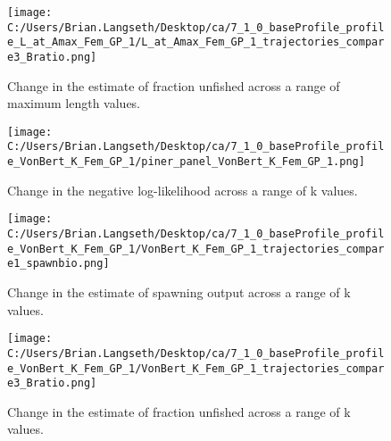 \documentclass[11pt,
  english,
  a4paper,
]{article}
\begin{document}

\begin{figure}
\centering
\texttt{[image: C:/Users/Brian.Langseth/Desktop/ca/7\_1\_0\_baseProfile\_profile\_L\_at\_Amax\_Fem\_GP\_1/L\_at\_Amax\_Fem\_GP\_1\_trajectories\_compare3\_Bratio.png]}
\caption{Change in the estimate of fraction unfished across a range of maximum length values.\label{fig:linf-depl}}
\end{figure}

\tagmcend\tagstructend


\begin{figure}
\centering
\texttt{[image: C:/Users/Brian.Langseth/Desktop/ca/7\_1\_0\_baseProfile\_profile\_VonBert\_K\_Fem\_GP\_1/piner\_panel\_VonBert\_K\_Fem\_GP\_1.png]}
\caption{Change in the negative log-likelihood across a range of k values.\label{fig:k-profile}}
\end{figure}

\tagmcend\tagstructend


\begin{figure}
\centering
\texttt{[image: C:/Users/Brian.Langseth/Desktop/ca/7\_1\_0\_baseProfile\_profile\_VonBert\_K\_Fem\_GP\_1/VonBert\_K\_Fem\_GP\_1\_trajectories\_compare1\_spawnbio.png]}
\caption{Change in the estimate of spawning output across a range of k values.\label{fig:k-ssb}}
\end{figure}

\tagmcend\tagstructend


\begin{figure}
\centering
\texttt{[image: C:/Users/Brian.Langseth/Desktop/ca/7\_1\_0\_baseProfile\_profile\_VonBert\_K\_Fem\_GP\_1/VonBert\_K\_Fem\_GP\_1\_trajectories\_compare3\_Bratio.png]}
\caption{Change in the estimate of fraction unfished across a range of k values.\label{fig:k-depl}}
\end{figure}
\end{document}
